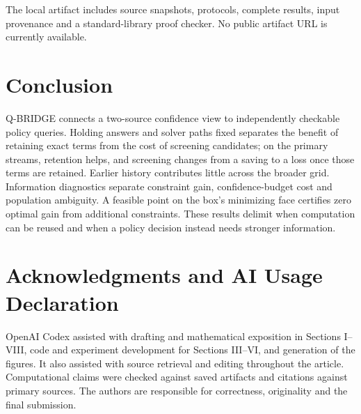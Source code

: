 \documentclass[conference]{IEEEtran}
\begin{document}
The local artifact includes source snapshots, protocols, complete results, input provenance and a standard-library proof checker. No public artifact URL is currently available.

\section{Conclusion}
Q-BRIDGE connects a two-source confidence view to independently checkable policy queries. Holding answers and solver paths fixed separates the benefit of retaining exact terms from the cost of screening candidates; on the primary streams, retention helps, and screening changes from a saving to a loss once those terms are retained. Earlier history contributes little across the broader grid. Information diagnostics separate constraint gain, confidence-budget cost and population ambiguity. A feasible point on the box's minimizing face certifies zero optimal gain from additional constraints. These results delimit when computation can be reused and when a policy decision instead needs stronger information.

\section*{Acknowledgments and AI Usage Declaration}
OpenAI Codex assisted with drafting and mathematical exposition in Sections I--VIII, code and experiment development for Sections III--VI, and generation of the figures. It also assisted with source retrieval and editing throughout the article. Computational claims were checked against saved artifacts and citations against primary sources. The authors are responsible for correctness, originality and the final submission.



\end{document}
